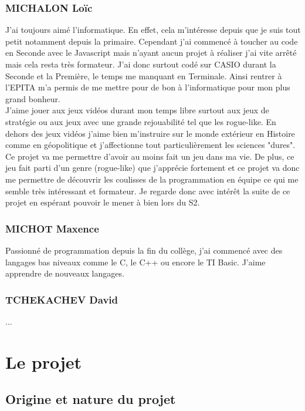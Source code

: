 \documentclass{article}
\begin{document}
\subsubsection{MICHALON Loïc}

J'ai toujours aimé l'informatique. En effet, cela m'intéresse depuis que je suis tout petit notamment depuis la primaire. Cependant j'ai commencé à toucher au code en Seconde avec le Javascript mais n'ayant aucun projet à réaliser j'ai vite arrêté mais cela resta très formateur. J'ai donc surtout codé sur CASIO durant la Seconde et la Première, le temps me manquant en Terminale. Ainsi rentrer à l'EPITA m'a permis de me mettre pour de bon à l'informatique pour mon plus grand bonheur. \\
J'aime jouer aux jeux vidéos durant mon temps libre surtout aux jeux de stratégie ou aux jeux avec une grande rejouabilité tel que les rogue-like. En dehors des jeux vidéos j'aime bien m'instruire sur le monde extérieur en Histoire comme en géopolitique et j'affectionne tout particulièrement les sciences "dures". \\
Ce projet va me permettre d'avoir au moins fait un jeu dans ma vie. De plus, ce jeu fait parti d'un genre (rogue-like) que j'apprécie fortement et ce projet va donc me permettre de découvrir les coulisses de la programmation en équipe ce qui me semble très intéressant et formateur. Je regarde donc avec intérêt la suite de ce projet en espérant pouvoir le mener à bien lors du S2.

\subsubsection{MICHOT Maxence}

Passionné de programmation depuis la fin du collège, j'ai commencé avec des langages bas niveaux comme le C, le C++ ou encore le TI Basic. J'aime apprendre de nouveaux langages.

\subsubsection{TCHEKACHEV David}

...

\pagebreak

\section{Le projet}

\subsection{Origine et nature du projet}
\end{document}
